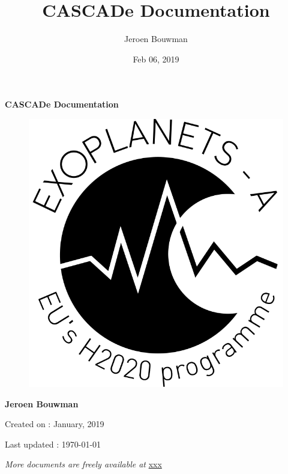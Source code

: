 \documentclass[a4paper,10pt,english]{sphinxmanual}
\title{CASCADe Documentation}
\date{Feb 06, 2019}
\author{Jeroen Bouwman}
\begin{document}
\pagestyle{empty}


        \begin{titlepage}
            \centering

            \vspace*{40mm} %
            \textbf{\Huge {CASCADe Documentation}}

            \vspace{0mm}
            \begin{figure}[!h]
                \centering
                \includegraphics[scale=0.3]{Exoplanets-A_Ecusson_Noir_Alpha.png}
            \end{figure}

            \vspace{0mm}
            \Large \textbf{{Jeroen Bouwman}}

            \small Created on : January, 2019

            \vspace*{0mm}
            \small  Last updated : \MonthYearFormat\today


            \vfill
            \small \textit{More documents are freely available at }{\href{http://xxx.html}{xxx}}
        \end{titlepage}
\end{document}
